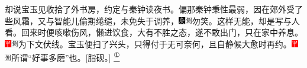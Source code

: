 却说宝玉见收拾了外书房，约定与秦钟读夜书。偏那秦钟秉性最弱，因在郊外受了些风霜，又与智能儿偷期绻缱，未免失于调养，{\includegraphics[width=3mm]{../Images/00004}\includegraphics[width=3mm]{../Images/00011}\footnotesize \kaishu 勿笑。这样无能，却是写与人看。}回来时便咳嗽伤风，懒进饮食，大有不胜之态，遂不敢出门，只在家中养息。{\includegraphics[width=3mm]{../Images/00002}\includegraphics[width=3mm]{../Images/00011}\footnotesize \kaishu 为下文伏线。}宝玉便扫了兴头，只得付于无可奈何，且自静候大愈时再约。{{{\includegraphics[width=3mm]{../Images/00002}\includegraphics[width=3mm]{../Images/00011}\footnotesize \kaishu 所谓``好事多磨''也。}{[}脂砚。{]}}
}\href{../Text/part0020_split_000.html\#lnkback_1_a}{\textsuperscript{①}}

